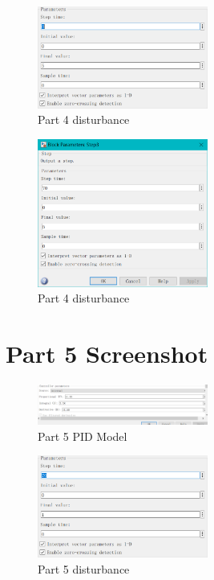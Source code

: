 \documentclass[11pt, a4paper]{article}
\begin{document}
\begin{figure}[htbp]     \begin{centering}
    \includegraphics[width=0.5\textwidth]{a4_3.png}
    \caption{Part 4 disturbance}
    \end{centering}
\end{figure}

\begin{figure}[htbp]     \begin{centering}
    \includegraphics[width=0.5\textwidth]{a4_4.png}
    \caption{Part 4 disturbance}
    \end{centering}
\end{figure}

\newpage
\section{Part 5 Screenshot}

\begin{figure}[htbp]     \begin{centering}
    \includegraphics[width=0.5\textwidth]{a5_1.png}
    \caption{Part 5 PID Model}
    \end{centering}
\end{figure}

\begin{figure}[htbp]     \begin{centering}
    \includegraphics[width=0.5\textwidth]{a5_2.png}
    \caption{Part 5 disturbance}
    \end{centering}
\end{figure}
\end{document}
